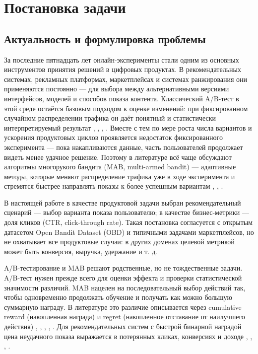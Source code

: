 \section{Постановка задачи}\label{ux433ux43bux430ux432ux430-1.-ux43fux43eux441ux442ux430ux43dux43eux432ux43aux430-ux437ux430ux434ux430ux447ux438}

\subsection{Актуальность и формулировка проблемы}\label{ux430ux43aux442ux443ux430ux43bux44cux43dux43eux441ux442ux44c-ux438-ux444ux43eux440ux43cux443ux43bux438ux440ux43eux432ux43aux430-ux43fux440ux43eux431ux43bux435ux43cux44b}

За последние пятнадцать лет онлайн-эксперименты стали одним из основных инструментов принятия решений в цифровых продуктах. В рекомендательных системах, рекламных платформах, маркетплейсах и системах ранжирования они применяются постоянно --- для выбора между альтернативными версиями интерфейсов, моделей и способов показа контента. Классический A/B-тест в этой среде остаётся базовым подходом к оценке изменений: при фиксированном случайном распределении трафика он даёт понятный и статистически интерпретируемый результат \cite{ref5}, \cite{ref6}, \cite{ref10}, \cite{ref11}. Вместе с тем по мере роста числа вариантов и ускорения продуктовых циклов проявляется недостаток фиксированного эксперимента --- пока накапливаются данные, часть пользователей продолжает видеть менее удачное решение. Поэтому в литературе всё чаще обсуждают алгоритмы многорукого бандита (MAB, multi-armed bandit) --- адаптивные методы, которые меняют распределение трафика уже в ходе эксперимента и стремятся быстрее направлять показы к более успешным вариантам \cite{ref1,ref2,ref3,ref4}, \cite{ref12}, \cite{ref13}.

В настоящей работе в качестве продуктовой задачи выбран рекомендательный сценарий --- выбор варианта показа пользователю; в качестве бизнес-метрики --- доля кликов (CTR, click-through rate). Такая постановка согласуется с открытым датасетом Open Bandit Dataset (OBD) и типичными задачами маркетплейсов, но не охватывает все продуктовые случаи: в других доменах целевой метрикой может быть конверсия, выручка, удержание и т. д.

A/B-тестирование и MAB решают родственные, но не тождественные задачи. A/B-тест нужен прежде всего для оценки эффекта и проверки статистической значимости различий. MAB нацелен на последовательный выбор действий так, чтобы одновременно продолжать обучение и получать как можно большую суммарную награду. В литературе это различие описывается через cumulative reward (накопленная награда) и regret (накопленное отставание от наилучшего действия) \cite{ref5}, \cite{ref12}, \cite{ref13}, \cite{ref18}, \cite{ref19}. Для рекомендательных систем с быстрой бинарной наградой цена неудачного показа выражается в потерянных кликах, конверсиях и доходе \cite{ref8}, \cite{ref12}, \cite{ref17}, \cite{ref18}.


